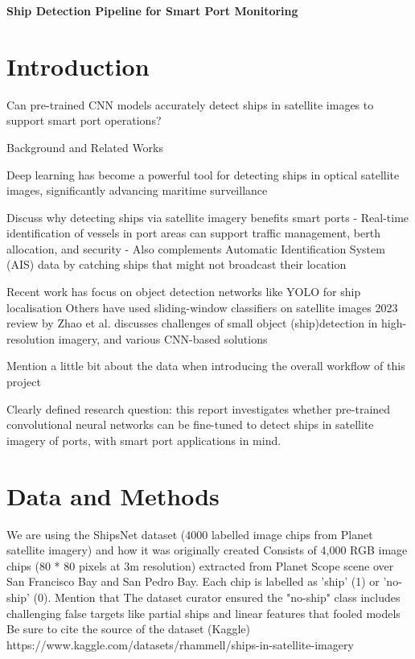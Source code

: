 \documentclass[11pt]{article}
\begin{document}
	
	\begin{center}
		\LARGE\textbf{Ship Detection Pipeline for Smart Port Monitoring}
	\end{center}
	
	\section*{Introduction}
	
	Can pre-trained CNN models accurately detect ships in satellite images to support smart port operations?

	Background and Related Works
	
	Deep learning has become a powerful tool for detecting ships in optical satellite images, significantly advancing maritime surveillance
	
	Discuss why detecting ships via satellite imagery benefits smart ports
	- Real-time identification of vessels in port areas can support traffic management, berth allocation, and security
	- Also complements Automatic Identification System (AIS) data by catching ships that might not broadcast their location
	
	Recent work has focus on object detection networks like YOLO for ship localisation
	Others have used sliding-window classifiers on satellite images
	2023 review by Zhao et al. discusses challenges of small object (ship)detection in high-resolution imagery, and various CNN-based solutions
	
	Mention a little bit about the data when introducing the overall workflow of this project
	
	Clearly defined research question: this report investigates whether pre-trained convolutional neural networks can be fine-tuned to detect ships in satellite imagery of ports, with smart port applications in mind.
	
	\newpage
	\section*{Data and Methods}
	
	We are using the ShipsNet dataset (4000 labelled image chips from Planet satellite imagery) and how it was originally created
	Consists of 4,000 RGB image chips (80 * 80 pixels at 3m resolution) extracted from Planet Scope scene over San Francisco Bay and San Pedro Bay. Each chip is labelled as 'ship' (1) or 'no-ship' (0). Mention that 
	The dataset curator ensured the "no-ship" class includes challenging false targets like partial ships and linear features that fooled models
	Be sure to cite the source of the dataset (Kaggle) https://www.kaggle.com/datasets/rhammell/ships-in-satellite-imagery
	
\end{document}
